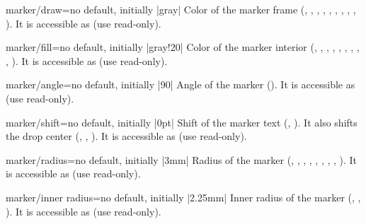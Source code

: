 \begin{docMrcKey}{marker/draw}{=}{no default, initially |gray|}
  Color of the marker frame
  (, , , ,
    , , , ,
    , ).
  It is accessible as  (use read-only).
\end{docMrcKey}

\begin{docMrcKey}{marker/fill}{=}{no default, initially |gray!20|}
  Color of the marker interior
  (, , , ,
    , , , ,
    , ).
  It is accessible as  (use read-only).
\end{docMrcKey}

\begin{docMrcKey}{marker/angle}{=}{no default, initially |90|}
  Angle of the marker ().
  It is accessible as  (use read-only).
\end{docMrcKey}

\begin{docMrcKey}{marker/shift}{=}{no default, initially |0pt|}
  Shift of the marker text
  (, ).
  It also shifts the drop center
  (, , ).
  It is accessible as  (use read-only).
\end{docMrcKey}

\begin{docMrcKey}{marker/radius}{=}{no default, initially |3mm|}
  Radius of the marker
  (, , ,
    , , , ,
    , ).
  It is accessible as  (use read-only).
\end{docMrcKey}

\begin{docMrcKey}{marker/inner radius}{=}{no default, initially |2.25mm|}
  Inner radius of the marker
  (, , ).
  It is accessible as  (use read-only).
\end{docMrcKey}


